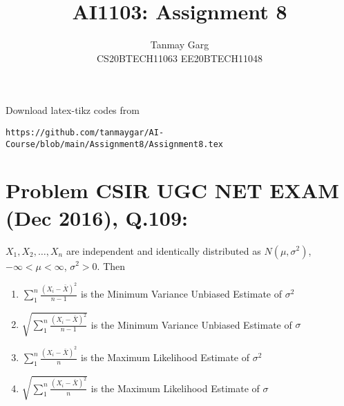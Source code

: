 \documentclass[journal,12pt,twocolumn]{IEEEtran}
\begin{document}
     \def\rightbox#1{\makebox[0in][r]{#1}}
     \def\centbox#1{\makebox[0in]{#1}}
     \def\topbox#1{\raisebox{-\baselineskip}[0in][0in]{#1}}
     \def\midbox#1{\raisebox{-0.5\baselineskip}[0in][0in]{#1}}
\vspace{3cm}
\title{AI1103: Assignment 8}
\author{Tanmay Garg \\CS20BTECH11063 EE20BTECH11048}
\maketitle
\newpage
\bigskip
\renewcommand{\thefigure}{\theenumi}
\renewcommand{\thetable}{\theenumi}
%
Download latex-tikz codes from 
%
\begin{lstlisting}
https://github.com/tanmaygar/AI-Course/blob/main/Assignment8/Assignment8.tex
\end{lstlisting}
\section*{Problem CSIR UGC NET EXAM (Dec 2016), Q.109: }
$X_1,X_2,\ldots,X_n$ are independent and identically
distributed as $N(\mu, \sigma^2)$, $-\infty < \mu < \infty$, $\sigma^2 > 0$. Then
\begin{enumerate}
    \item $\sum_1^n\frac{(X_i-\bar{X})^2}{n-1}$ is the Minimum Variance Unbiased Estimate of $\sigma^2$\\
    \item $\sqrt{\sum_1^n\frac{(X_i-\bar{X})^2}{n-1}}$ is the Minimum Variance Unbiased Estimate of $\sigma$\\
    \item $\sum_1^n\frac{(X_i-\bar{X})^2}{n}$ is the Maximum Likelihood Estimate of $\sigma^2$\\
    \item $\sqrt{\sum_1^n\frac{(X_i-\bar{X})^2}{n}}$ is the Maximum Likelihood \qquad Estimate of $\sigma$
\end{enumerate}
\end{document}
